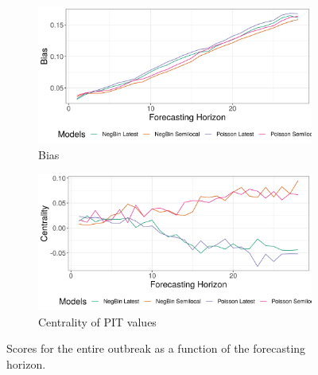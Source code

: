 \begin{figure}[H]
\begin{subfigure}{0.5\textwidth}
  \centering
  \includegraphics[width=\linewidth]{../output/Mutwanga_bias.png}  
  \caption{Bias}
  \label{fig:sub-third}
\end{subfigure}
\begin{subfigure}{0.5\textwidth}
  \centering
  \includegraphics[width=\linewidth]{../output/Mutwanga_centrality.png}  
  \caption{Centrality of PIT values}
  \label{fig:nat_scores_4}
\end{subfigure}
  \caption{Scores for the entire outbreak as a function of the forecasting horizon.}

  \label{fig:nat_scores}
\end{figure}
